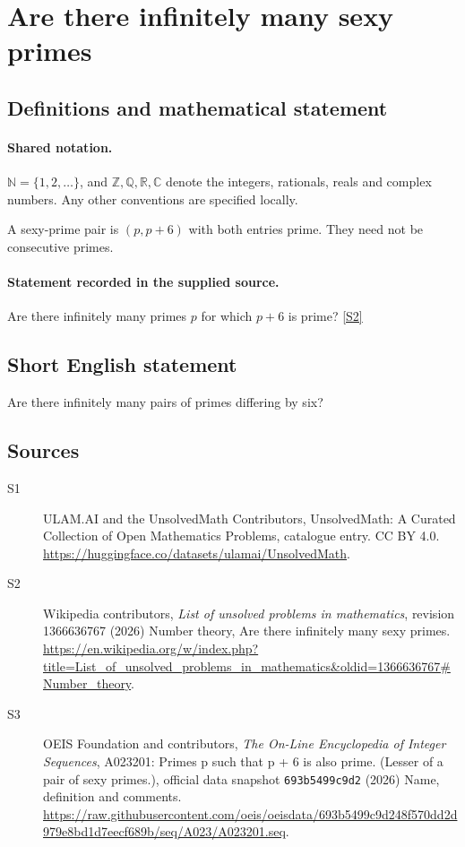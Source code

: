 \documentclass[11pt]{article}
\newcommand{\sref}[2]{\hyperlink{source:#1:#2}{[S#2]}}
\begin{document}
\section{Are there infinitely many sexy primes}\label{statement}

\subsection{Definitions and mathematical statement}

\paragraph{Shared notation.}$\mathbb N=\{1,2,\ldots\}$, and $\mathbb Z,\mathbb Q,\mathbb R,\mathbb C$ denote the integers, rationals, reals and complex numbers. Any other conventions are specified locally.


A sexy-prime pair is $(p,p+6)$ with both entries prime. They need not be consecutive primes.
\paragraph{Statement recorded in the supplied source.}
Are there infinitely many primes $p$ for which $p+6$ is prime? \sref{statement}{2}
\subsection{Short English statement}
Are there infinitely many pairs of primes differing by six?
\subsection{Sources}
\begin{description}
\item[\hypertarget{source:statement:1}{S1}] ULAM.AI and the UnsolvedMath Contributors, UnsolvedMath: A Curated Collection of Open Mathematics Problems, catalogue entry. CC BY 4.0. \url{https://huggingface.co/datasets/ulamai/UnsolvedMath}.
\item[\hypertarget{source:statement:2}{S2}] Wikipedia contributors, \emph{List of unsolved problems in mathematics}, revision 1366636767 (2026) Number theory, Are there infinitely many sexy primes. \url{https://en.wikipedia.org/w/index.php?title=List_of_unsolved_problems_in_mathematics&oldid=1366636767#Number_theory}.
\item[\hypertarget{source:statement:3}{S3}] OEIS Foundation and contributors, \emph{The On-Line Encyclopedia of Integer Sequences}, A023201: Primes p such that p + 6 is also prime. (Lesser of a pair of sexy primes.), official data snapshot \texttt{693b5499c9d2} (2026) Name, definition and comments. \url{https://raw.githubusercontent.com/oeis/oeisdata/693b5499c9d248f570dd2d979e8bd1d7eecf689b/seq/A023/A023201.seq}.
\end{description}
\label{end:statement}
\end{document}
